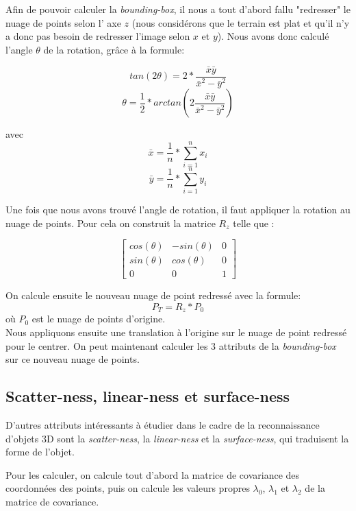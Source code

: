 		Afin de pouvoir calculer la \emph{bounding-box}, il nous a tout d'abord fallu  "redresser" le nuage de points selon l' axe $z$ (nous considérons que le terrain est plat et qu'il n'y a donc pas besoin de redresser l'image selon $x$ et $y$).
		Nous avons donc calculé l'angle $\theta$ de la rotation, grâce à la formule:

		\[ tan(2 \theta) = 2 * \frac{\bar{x}\bar{y}}{\bar{x}^2 - \bar{y}^2} \]
		\[ \theta = \frac{1}{2} * arctan(2 \frac{\bar{x}\bar{y}}{\bar{x}^2 - \bar{y}^2}) \]

		avec \[ \bar{x} = \frac{1}{n} * \sum_{i =1}^n{x_i} \]
		\[ \bar{y} = \frac{1}{n} * \sum_{i =1}^n{y_i} \]

		Une fois que nous avons trouvé l'angle de rotation, il faut appliquer la rotation au nuage de points. Pour cela on construit la matrice $R_z$ telle que :

		\[\begin{bmatrix}
		   cos(\theta) & -sin(\theta) & 0 \\
		sin(\theta) & cos(\theta) & 0 \\
		0 & 0 & 1
		\end{bmatrix}\]

		On calcule ensuite le nouveau nuage de point redressé avec la formule:
		\[ P_T = R_z * P_0\]
		où $P_0$ est le nuage de points d'origine. \\

		Nous appliquons ensuite une translation à l'origine sur le nuage de point redressé pour le centrer. On peut maintenant calculer les 3 attributs de la \emph{bounding-box} sur ce nouveau nuage de points.


	\subsection{Scatter-ness, linear-ness et surface-ness}
		D'autres attributs intéressants à étudier dans le cadre de la reconnaissance d'objets 3D sont la \emph{scatter-ness}, la \emph{linear-ness} et la \emph{surface-ness}, qui traduisent la forme de l'objet.

		Pour les calculer, on calcule tout d'abord la matrice de covariance des coordonnées des points, puis on calcule les valeurs propres $\lambda_0$, $\lambda_1$ et $\lambda_2$ de la matrice de covariance. \\

